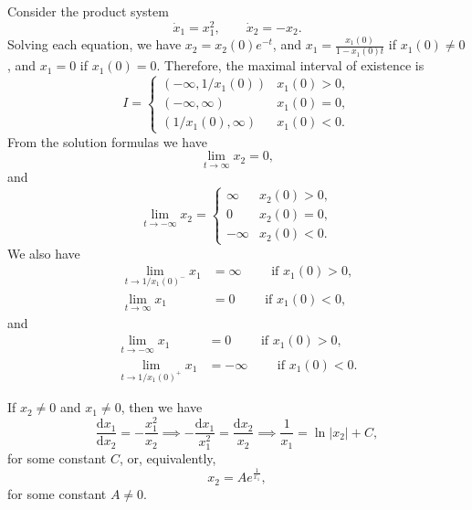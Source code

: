 \documentclass[nonumber]{homework}
\begin{document}
	\maketitle
	
	
	Consider the product system
	\begin{equation*}
		\dot{x}_1 = x_1^2, \qquad \dot{x}_2 = -x_2.
	\end{equation*}
	Solving each equation, we have $x_2 = x_2(0)e^{-t}$, and $x_1 = \frac{x_1(0)}{1-x_1(0) t}$ if $x_1(0)\ne0$, and $x_1 = 0$ if $x_1(0) = 0$. Therefore, the maximal interval of existence is 
	\begin{equation*}
		I = \begin{cases}
			(-\infty, 1/x_1(0))& x_1(0) > 0,\\
			 (-\infty, \infty) & x_1(0) = 0, \\
			 (1/x_1(0), \infty) & x_1(0) < 0.
			\end{cases}
	\end{equation*}
	From the solution formulas we have
	\begin{equation*}
		\lim_{t\to \infty} x_2 = 0,
	\end{equation*}
	and
	\begin{equation*}
		\lim_{t\to-\infty}x_2 = \begin{cases}
			\infty & x_2(0) > 0, \\
			0 & x_2(0) = 0,\\
			-\infty & x_2(0) < 0.
		\end{cases}
	\end{equation*}
	We also have
	\begin{align*}
		\lim_{t\to 1/x_1(0)^-} x_1 &= \infty \qquad \text{ if } x_1(0) > 0,\\
		\lim_{t\to\infty} x_1 &= 0 \qquad \text{ if } x_1(0) < 0,
	\end{align*}
	and
	\begin{align*}
		\lim_{t\to -\infty} x_1 &= 0 \qquad \text{ if } x_1(0) > 0,\\
		\lim_{t\to 1/x_1(0)^+} x_1 &= -\infty \qquad \text{ if } x_1(0) < 0.
	\end{align*}
	
	If $x_2 \ne0$ and $x_1\ne0$, then we have
	\begin{equation*}
		\frac{\text{d}x_1}{\text{d}x_2} = -\frac{x_1^2}{x_2} \implies -\frac{\text{d}x_1}{x_1^2} = \frac{\text{d}x_2}{x_2} \implies \frac{1}{x_1} = \ln|x_2| + C,
	\end{equation*}
	for some constant $C$, or, equivalently,
	\begin{equation*}
		x_2 = Ae^\frac{1}{x_1},
	\end{equation*}
	for some constant $A \ne0$.
	
\end{document}
